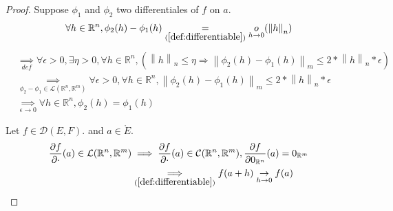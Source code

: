 \documentclass[11pt,en]{elegantpaper}
\newcommand{\norm}[1]{\left\lVert#1\right\rVert}
\newcommand{\Real}{\mathbb{R}}
\begin{document}
\begin{proof}
  Suppose $\phi_1$ and $\phi_2$ two differentiales of $f$ on $a$. \begin{equation*}
    \begin{gathered}
      \forall h \in \Real^n, \phi_2(h) - \phi_1(h) \underset{(\ref{def:differentiable})} = \underset{h \to 0}o(\norm h _n)
    \end{gathered}
  \end{equation*}
  \begin{equation*}
    \begin{split}
      & \underset{def} \implies \forall \epsilon > 0, \exists \eta > 0, \forall h \in \Real^n, (\norm h _n \leq \eta \Rightarrow \norm{\phi_2(h) - \phi_1(h)}_m \leq 2 * \norm h _n * \epsilon) \\
      & \underset{\phi_2 - \phi_1 \in \mathcal{L}(\Real^n,\Real^m)} \implies \forall \epsilon > 0, \forall h \in \Real^n, \norm{\phi_2(h) - \phi_1(h)}_m \leq 2 * \norm h _n * \epsilon \\
      & \underset{\epsilon \to 0} \implies \forall h \in \Real^n, \phi_2(h) = \phi_1(h)
    \end{split}
  \end{equation*}
  
  Let $f \in \mathcal{D}(E,F).$ and $a \in \mathring{E}$. \begin{equation*}
    \begin{split}
      \frac{\partial f}{\partial \cdot}(a) \in \mathcal{L}(\Real^n,\Real^m) & \implies \frac{\partial f}{\partial \cdot}(a) \in \mathcal{C}(\Real^n,\Real^m), \frac{\partial f}{\partial 0_{\Real^n}}(a) = 0_{\Real^m} \label{} \\
      & \underset{(\ref{def:differentiable})} \implies f(a + h) \underset{h \to 0} \to f(a)
    \end{split}
  \end{equation*}
\end{proof}
\end{document}
